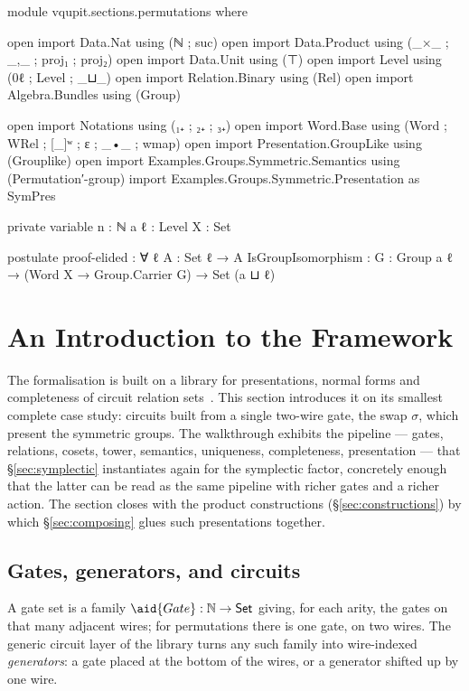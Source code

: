 \begin{code}[hide]
module vqupit.sections.permutations where

open import Data.Nat using (ℕ ; suc)
open import Data.Product using (_×_ ; _,_ ; proj₁ ; proj₂)
open import Data.Unit using (⊤)
open import Level using (0ℓ ; Level ; _⊔_)
open import Relation.Binary using (Rel)
open import Algebra.Bundles using (Group)

open import Notations using (₁₊ ; ₂₊ ; ₃₊)
open import Word.Base using (Word ; WRel ; [_]ʷ ; ε ; _•_ ; wmap)
open import Presentation.GroupLike using (Grouplike)
open import Examples.Groups.Symmetric.Semantics using (Permutation′-group)
import Examples.Groups.Symmetric.Presentation as SymPres

private variable
  n : ℕ
  a ℓ : Level
  X : Set

postulate
  proof-elided : ∀ {ℓ} {A : Set ℓ} → A
  IsGroupIsomorphism : {G : Group a ℓ} → (Word X → Group.Carrier G) → Set (a ⊔ ℓ)
\end{code}
\section{An Introduction to the Framework}\label{sec:permutations}

The formalisation is built on a library for presentations, normal forms
and completeness of circuit relation
sets~\cite{bian2026framework,qupit-code}.  This section introduces it on
its smallest complete case study: circuits built from a single two-wire
gate, the swap $\sigma$, which present the symmetric groups.  The
walkthrough exhibits the pipeline --- gates,
relations, cosets, tower, semantics, uniqueness, completeness,
presentation --- that \S\ref{sec:symplectic} instantiates again for the
symplectic factor, concretely enough that the latter can be read as the
same pipeline with richer gates and a richer action.  The section closes
with the product constructions (\S\ref{sec:constructions}) by which
\S\ref{sec:composing} glues such presentations together.

\subsection{Gates, generators, and circuits}\label{sec:sn-gates}

A gate set is a family $\aid{Gate} : \mathbb{N} \to \mathsf{Set}$ giving,
for each arity, the gates on that many adjacent wires; for permutations
there is one gate, on two wires.  The generic circuit layer of the
library turns any such family into wire-indexed
\emph{generators}: a gate placed at the bottom of the wires, or a
generator shifted up by one wire.

